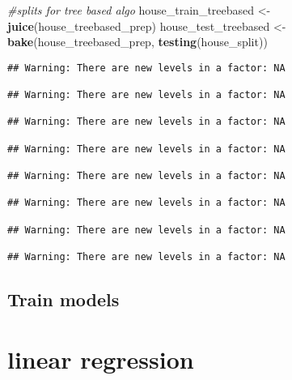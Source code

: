 \documentclass[
]{article}
\newenvironment{Shaded}{\begin{snugshade}}{\end{snugshade}}
\newcommand{\CommentTok}[1]{\textcolor[rgb]{0.56,0.35,0.01}{\textit{#1}}}
\newcommand{\DataTypeTok}[1]{\textcolor[rgb]{0.13,0.29,0.53}{#1}}
\newcommand{\KeywordTok}[1]{\textcolor[rgb]{0.13,0.29,0.53}{\textbf{#1}}}
\newcommand{\NormalTok}[1]{#1}
\newcommand{\OperatorTok}[1]{\textcolor[rgb]{0.81,0.36,0.00}{\textbf{#1}}}
\newcommand{\StringTok}[1]{\textcolor[rgb]{0.31,0.60,0.02}{#1}}
\begin{document}
\begin{Shaded}
\begin{Highlighting}[]
\CommentTok{#splits for tree based algo}
\NormalTok{house_train_treebased <-}\StringTok{ }\KeywordTok{juice}\NormalTok{(house_treebased_prep)}
\NormalTok{house_test_treebased <-}\StringTok{ }\KeywordTok{bake}\NormalTok{(house_treebased_prep, }\KeywordTok{testing}\NormalTok{(house_split))}
\end{Highlighting}
\end{Shaded}

\begin{verbatim}
## Warning: There are new levels in a factor: NA

## Warning: There are new levels in a factor: NA

## Warning: There are new levels in a factor: NA

## Warning: There are new levels in a factor: NA

## Warning: There are new levels in a factor: NA

## Warning: There are new levels in a factor: NA

## Warning: There are new levels in a factor: NA

## Warning: There are new levels in a factor: NA
\end{verbatim}

\hypertarget{train-models}{%
\subsection{Train models}\label{train-models}}

\hypertarget{linear-regression}{%
\section{linear regression}\label{linear-regression}}

\begin{Shaded}
\end{Shaded}
\end{document}
